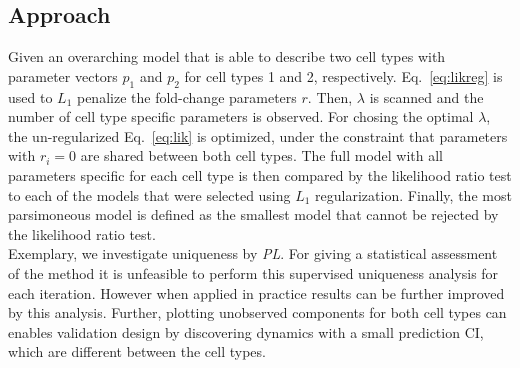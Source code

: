 \documentclass{bioinfo}
\begin{document}
\begin{methods}
\section{Approach}
Given an overarching model that is able to describe two cell types with parameter vectors $p_1$ and $p_2$ for cell types 1 and 2, respectively.
Eq.~\ref{eq:likreg} is used to $L_1$ penalize the fold-change parameters $r$.
Then, $\lambda$ is scanned and the number of cell type specific parameters is observed.
For chosing the optimal $\lambda$, the un-regularized Eq.~\ref{eq:lik} is optimized, under the constraint that parameters with $r_i = 0$ are shared between both cell types.
The full model with all parameters specific for each cell type is then compared by the likelihood ratio test to each of the models that were selected using $L_1$ regularization.
Finally, the most parsimoneous model is defined as the smallest model that cannot be rejected by the likelihood ratio test.\\
Exemplary, we investigate uniqueness by \emph{PL}.
For giving a statistical assessment of the method it is unfeasible to perform this supervised uniqueness analysis for each iteration.
However when applied in practice results can be further improved by this analysis.
Further, plotting unobserved components for both cell types can enables validation design by discovering dynamics with a small prediction CI, which are different between the cell types.


\end{methods}
\end{document}
